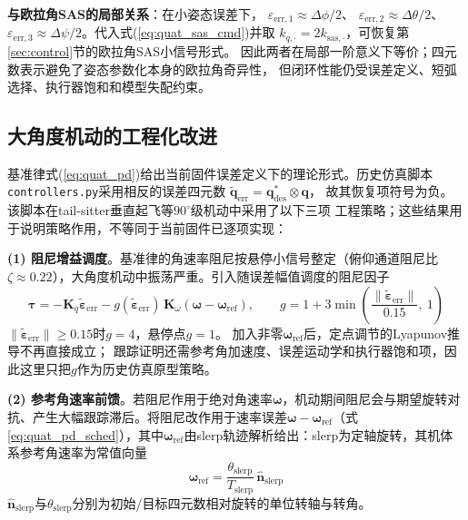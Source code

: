 \textbf{与欧拉角SAS的局部关系}：在小姿态误差下，
$\varepsilon_{\text{err},1}\approx\Delta\phi/2$、
$\varepsilon_{\text{err},2}\approx\Delta\theta/2$、
$\varepsilon_{\text{err},3}\approx\Delta\psi/2$。代入式(\ref{eq:quat_sas_cmd})并取
$k_{q,\cdot}=2k_{\text{sas},\cdot}$，可恢复第\ref{sec:control}节的欧拉角SAS小信号形式。
因此两者在局部一阶意义下等价；四元数表示避免了姿态参数化本身的欧拉角奇异性，
但闭环性能仍受误差定义、短弧选择、执行器饱和和模型失配约束。

\subsection{大角度机动的工程化改进}
\label{sec:quat_sas_engineering}

基准律式(\ref{eq:quat_pd})给出当前固件误差定义下的理论形式。历史仿真脚本
\texttt{controllers.py}采用相反的误差四元数
$\widetilde{\mathbf q}_{\mathrm{err}}=\mathbf q_{\mathrm{des}}^*\otimes\mathbf q$，
故其恢复项符号为负。该脚本在tail-sitter垂直起飞等$90^\circ$级机动中采用了以下三项
工程策略；这些结果用于说明策略作用，不等同于当前固件已逐项实现：

\textbf{(1) 阻尼增益调度}。基准律的角速率阻尼按悬停小信号整定（俯仰通道阻尼比$\zeta\approx0.22$），大角度机动中振荡严重。引入随误差幅值调度的阻尼因子
\begin{equation}
    \boldsymbol{\tau} = -\mathbf{K}_q\widetilde{\boldsymbol{\varepsilon}}_{\text{err}} - g(\widetilde{\boldsymbol{\varepsilon}}_{\text{err}})\,\mathbf{K}_\omega\left(\boldsymbol{\omega} - \boldsymbol{\omega}_{\text{ref}}\right),
    \qquad
    g = 1 + 3\min\!\left(\frac{\|\widetilde{\boldsymbol{\varepsilon}}_{\text{err}}\|}{0.15},\ 1\right)
    \label{eq:quat_pd_sched}
\end{equation}
$\|\widetilde{\boldsymbol{\varepsilon}}_{\text{err}}\|\geq0.15$时$g=4$，悬停点$g=1$。
加入非零$\boldsymbol\omega_{\mathrm{ref}}$后，定点调节的Lyapunov推导不再直接成立；
跟踪证明还需参考角加速度、误差运动学和执行器饱和项，因此这里只把$g$作为历史仿真原型策略。

\textbf{(2) 参考角速率前馈}。若阻尼作用于绝对角速率$\boldsymbol{\omega}$，机动期间阻尼会与期望旋转对抗、产生大幅跟踪滞后。将阻尼改作用于速率误差$\boldsymbol{\omega}-\boldsymbol{\omega}_{\text{ref}}$（式\ref{eq:quat_pd_sched}），其中$\boldsymbol{\omega}_{\text{ref}}$由slerp轨迹解析给出：slerp为定轴旋转，其机体系参考角速率为常值向量
\begin{equation}
    \boldsymbol{\omega}_{\text{ref}} = \frac{\theta_{\text{slerp}}}{T_{\text{slerp}}}\,\hat{\mathbf{n}}_{\text{slerp}}
    \label{eq:omega_ref_slerp}
\end{equation}
$\hat{\mathbf{n}}_{\text{slerp}}$与$\theta_{\text{slerp}}$分别为初始/目标四元数相对旋转的单位转轴与转角。

